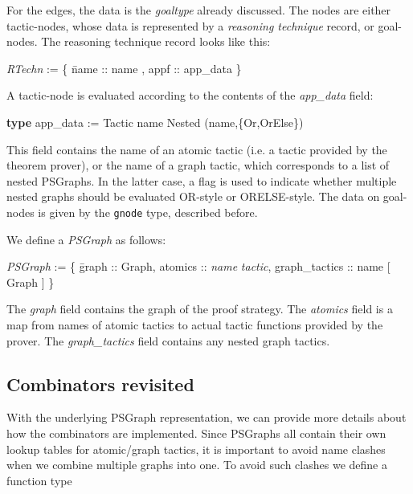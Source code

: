 \documentclass[submission,copyright,creativecommons]{eptcs}
\begin{document}
For the edges, the data is the \emph{goaltype} already discussed. The nodes are either tactic-nodes, whose data is represented by a \textit{reasoning technique} record, or goal-nodes. The reasoning technique record looks like this:
{\it \begin{tabbing}
\textit{RTechn} := \{ \= name :: name , appf :: app\_data \} \\
\end{tabbing}}
\vspace{-15pt}
\noindent A tactic-node is evaluated according to the contents of the \emph{app\_data} field:
{\it \begin{tabbing}
\textbf{type} app\_data := Tactic name  Nested (name,\{Or,OrElse\}) \\
\end{tabbing}}
\vspace{-15pt}
\noindent 
This field contains the name of an atomic tactic (i.e. a tactic provided by the theorem prover), or the name of a graph tactic, which corresponds to a list of nested PSGraphs. In the latter case, a flag is used to indicate whether multiple nested graphs should be evaluated OR-style or ORELSE-style.
The data on goal-nodes is given by the \texttt{gnode} type, described before.


We define a \emph{PSGraph} as follows:
\newcommand{\fmap}{\mbox{}}
{\it
\begin{tabbing}
\quad\textit{PSGraph} := \{ \= graph :: Graph, 
 atomics :: \textit{name} \fmap{} \textit{tactic},
 graph\_tactics :: name \fmap{} [ Graph ] \} \\
\end{tabbing}}
\vspace{-15pt}
\noindent 
The \emph{graph} field contains the graph of the proof strategy. The \emph{atomics} field is a map from names of atomic tactics to actual tactic functions provided by the prover. The \emph{graph\_tactics} field contains any nested graph tactics.

\subsection{Combinators revisited}

With the underlying PSGraph representation, we can provide more details about how the combinators are implemented. Since PSGraphs all contain their own lookup tables for atomic/graph tactics, it is important to avoid name clashes when we combine multiple graphs into one. To avoid such clashes we define a function type
\end{document}
